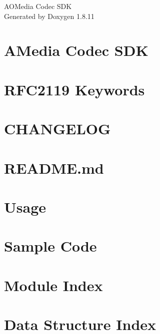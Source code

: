 \documentclass[twoside]{article}
\newcommand{\+}{\discretionary{\mbox{\scriptsize$\hookleftarrow$}}{}{}}
\begin{document}
\hypersetup{pageanchor=false,
             bookmarksnumbered=true,
             pdfencoding=unicode
            }
\begin{titlepage}
\vspace*{7cm}
\begin{center}%
{\Large A\+O\+Media Codec S\+DK }\\
\vspace*{1cm}
{\large Generated by Doxygen 1.8.11}\\
\end{center}
\end{titlepage}
\tableofcontents
{}
\hypersetup{pageanchor=true}

\section{A\+Media Codec S\+DK}
\label{index}\hypertarget{index}{}
\section{R\+F\+C2119 Keywords}
\label{rfc2119}
\hypertarget{rfc2119}{}

\section{C\+H\+A\+N\+G\+E\+L\+OG}
\label{changelog}
\hypertarget{changelog}{}

\section{R\+E\+A\+D\+M\+E.\+md}
\label{readme}
\hypertarget{readme}{}

\section{Usage}
\label{usage}
\hypertarget{usage}{}

\section{Sample Code}
\label{samples}
\hypertarget{samples}{}

\section{Module Index}

\section{Data Structure Index}

\end{document}
